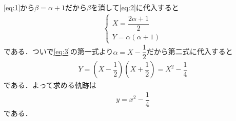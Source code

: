 \documentclass[../../main.tex]{subfiles}
\begin{document}
\cref{eq:1}から$\beta=\alpha+1$だから$\beta$を消して\cref{eq:2}に代入すると
\begin{align}
  \begin{cases}\displaystyle
    X=\dfrac{2\alpha+1}{2} \\
    Y=\alpha(\alpha+1)
  \end{cases} \label{eq:3}
\end{align}
である．ついで\cref{eq:3}の第一式より$\alpha=X-\dfrac{1}{2}$だから第二式に代入すると
\begin{align}
  Y=\left(X-\dfrac{1}{2}\right)\left(X+\dfrac{1}{2}\right)=X^2-\dfrac{1}{4}
\end{align}
である．よって求める軌跡は
\begin{align}
  y=x^2-\dfrac{1}{4}
\end{align}
である．

\newpage
\end{document}
